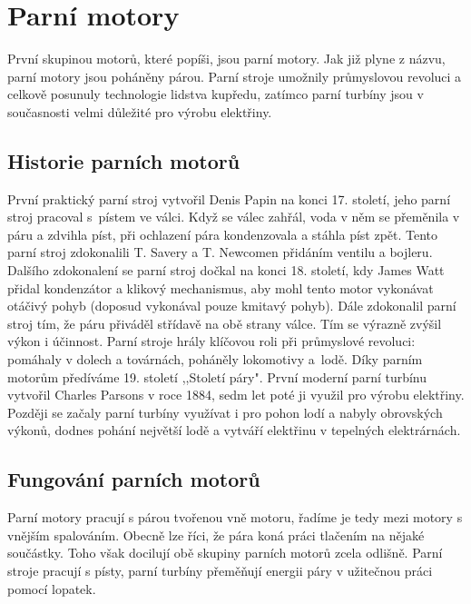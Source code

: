 \section{Parní motory}
{První skupinou motorů, které popíši, jsou parní motory. Jak již plyne z názvu, parní motory jsou poháněny párou. Parní stroje umožnily průmyslovou revoluci a celkově posunuly technologie lidstva kupředu, zatímco parní turbíny jsou v současnosti velmi důležité pro výrobu elektřiny.}

\subsection{Historie parních motorů}
{První praktický parní stroj vytvořil Denis Papin na konci 17. století, jeho parní stroj pracoval s~pístem ve válci. Když se válec zahřál, voda v něm se přeměnila v páru a zdvihla píst, při ochlazení pára kondenzovala a stáhla píst zpět. Tento parní stroj zdokonalili T. Savery a T. Newcomen přidáním ventilu a bojleru. Dalšího zdokonalení se parní stroj dočkal na konci 18. století, kdy James Watt přidal kondenzátor a klikový mechanismus, aby mohl tento motor vykonávat otáčivý pohyb (doposud vykonával pouze kmitavý pohyb). Dále zdokonalil parní stroj tím, že páru přiváděl střídavě na obě strany válce. Tím se výrazně zvýšil výkon i účinnost. Parní stroje hrály klíčovou roli při průmyslové revoluci: pomáhaly v dolech a továrnách, poháněly lokomotivy a~lodě. Díky parním motorům předíváme 19. století ,,Století páry".}
\cite{st:parniStroj}\odst
{První moderní parní turbínu vytvořil Charles Parsons v roce 1884, sedm let poté ji využil pro výrobu elektřiny. Později se začaly parní turbíny využívat i pro pohon lodí a nabyly obrovských výkonů, dodnes pohání největší lodě a vytváří elektřinu v tepelných elektrárnách.}
\cite{SA:SteamTurbines}

\subsection{Fungování parních motorů}
{Parní motory pracují s párou tvořenou vně motoru, řadíme je tedy mezi motory s vnějším spalováním. Obecně lze říci, že pára koná práci tlačením na nějaké součástky. Toho však docilují obě skupiny parních motorů zcela odlišně. Parní stroje pracují s písty, parní turbíny přeměňují energii páry v užitečnou práci pomocí lopatek.}

